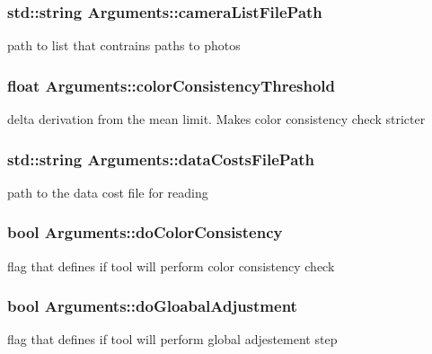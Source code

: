 \subsubsection[{camera\+List\+File\+Path}]{\setlength{\rightskip}{0pt plus 5cm}std\+::string Arguments\+::camera\+List\+File\+Path}\label{struct_arguments_a033abba738ba0403e87f883cc203d618}
path to list that contrains paths to photos \hypertarget{struct_arguments_a427521a6262f69340de5f09fdb3292d0}{}
\subsubsection[{color\+Consistency\+Threshold}]{\setlength{\rightskip}{0pt plus 5cm}float Arguments\+::color\+Consistency\+Threshold}\label{struct_arguments_a427521a6262f69340de5f09fdb3292d0}
delta derivation from the mean limit. Makes color consistency check stricter \hypertarget{struct_arguments_aaa04b2622a7712dd05c28101c149b116}{}
\subsubsection[{data\+Costs\+File\+Path}]{\setlength{\rightskip}{0pt plus 5cm}std\+::string Arguments\+::data\+Costs\+File\+Path}\label{struct_arguments_aaa04b2622a7712dd05c28101c149b116}
path to the data cost file for reading \hypertarget{struct_arguments_aba3898efc576d5bd85f4f89e7b0b79a6}{}
\subsubsection[{do\+Color\+Consistency}]{\setlength{\rightskip}{0pt plus 5cm}bool Arguments\+::do\+Color\+Consistency}\label{struct_arguments_aba3898efc576d5bd85f4f89e7b0b79a6}
flag that defines if tool will perform color consistency check \hypertarget{struct_arguments_a35c85467eaefb45dd9c5573c5697d0be}{}
\subsubsection[{do\+Gloabal\+Adjustment}]{\setlength{\rightskip}{0pt plus 5cm}bool Arguments\+::do\+Gloabal\+Adjustment}\label{struct_arguments_a35c85467eaefb45dd9c5573c5697d0be}
flag that defines if tool will perform global adjestement step \hypertarget{struct_arguments_a37157aeefb4bab06270e0787c0bac2cb}{}
